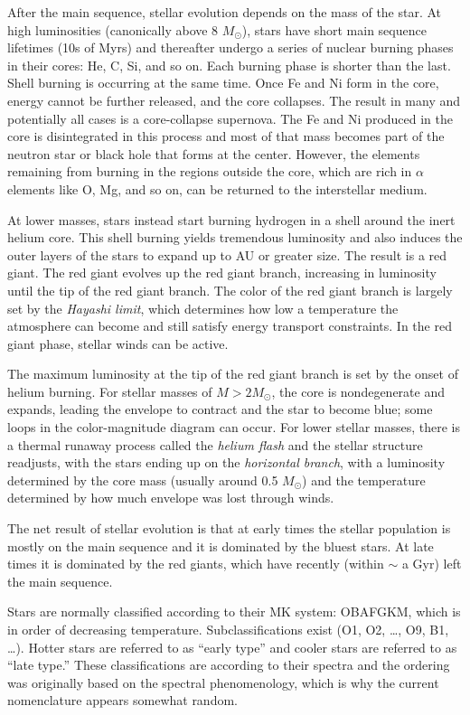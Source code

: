 After the main sequence, stellar evolution depends on the mass of the
star. At high luminosities (canonically above 8 $M_\odot$), stars have
short main sequence lifetimes (10s of Myrs) and thereafter undergo a
series of nuclear burning phases in their cores: He, C, Si, and so
on. Each burning phase is shorter than the last.  Shell burning is
occurring at the same time. Once Fe and Ni form in the core, energy
cannot be further released, and the core collapses. The result in many
and potentially all cases is a core-collapse supernova. The Fe and Ni
produced in the core is disintegrated in this process and most of that
mass becomes part of the neutron star or black hole that forms at the
center. However, the elements remaining from burning in the regions
outside the core, which are rich in $\alpha$ elements like O, Mg, and
so on, can be returned to the interstellar medium.

At lower masses, stars instead start burning hydrogen in a shell
around the inert helium core. This shell burning yields tremendous
luminosity and also induces the outer layers of the stars to expand up
to AU or greater size. The result is a red giant. The red giant
evolves up the red giant branch, increasing in luminosity until the
tip of the red giant branch. The color of the red giant branch is
largely set by the {\it Hayashi limit}, which determines how low a
temperature the atmosphere can become and still satisfy energy
transport constraints. In the red giant phase, stellar winds can be
active.

The maximum luminosity at the tip of the red giant branch is set by
the onset of helium burning. For stellar masses of $M>2M_\odot$, the
core is nondegenerate and expands, leading the envelope to contract
and the star to become blue; some loops in the color-magnitude diagram
can occur. For lower stellar masses, there is a thermal runaway
process called the {\it helium flash} and the stellar structure
readjusts, with the stars ending up on the {\it horizontal branch},
with a luminosity determined by the core mass (usually around 0.5
$M_\odot$) and the temperature determined by how much envelope was
lost through winds.

The net result of stellar evolution is that at early times the stellar
population is mostly on the main sequence and it is dominated by the
bluest stars. At late times it is dominated by the red giants, which
have recently (within $\sim$ a Gyr) left the main sequence.

Stars are normally classified according to their MK system: OBAFGKM,
which is in order of decreasing temperature. Subclassifications exist
(O1, O2, \ldots, O9, B1, \ldots). Hotter stars are referred to as
``early type'' and cooler stars are referred to as ``late type.''
These classifications are according to their spectra and the ordering
was originally based on the spectral phenomenology, which is why the
current nomenclature appears somewhat random.

